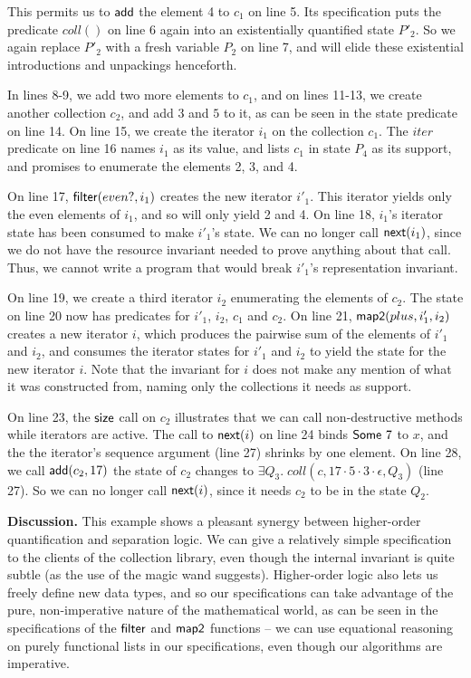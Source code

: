 \documentclass[preprint,natbib]{sigplanconf}
\begin{document}
This permits us to $\mbox{\textsf{{add}}}$ the element 4 to $c_1$ on line 5. Its
specification puts the predicate $coll()$ on line 6 again into an
existentially quantified state $P'_2$. So we again replace $P'_2$ with
a fresh variable $P_2$ on line 7, and will elide these existential
introductions and unpackings henceforth.

In lines 8-9, we add two more elements to $c_1$, and on lines 11-13,
we create another collection $c_2$, and add $3$ and $5$ to it, as can
be seen in the state predicate on line 14. On line 15, we create the
iterator $i_1$ on the collection $c_1$. The $iter$ predicate on line
16 names $i_1$ as its value, and lists $c_1$ in state $P_4$ as its
support, and promises to enumerate the elements 2, 3, and 4.

On line 17, $\mbox{\textsf{{filter}}}(even?, i_1)$ creates the new iterator
$i'_1$. This iterator yields only the even elements of $i_1$, and so
will only yield 2 and 4. On line 18, $i_1$'s iterator state has been
consumed to make $i'_1$'s state. We can no longer call
$\mbox{\textsf{{next}}}(i_1)$, since we do not have the resource invariant
needed to prove anything about that call. Thus, we cannot write a
program that would break $i'_1$'s representation invariant.

On line 19, we create a third iterator $i_2$ enumerating the elements
of $c_2$. The state on line 20 now has predicates for $i'_1$, $i_2$,
$c_1$ and $c_2$. On line 21, $\mbox{\textsf{{map2}}}(plus, i'_1, i_2)$ creates a
new iterator $i$, which produces the pairwise sum of the elements of
$i'_1$ and $i_2$, and consumes the iterator states for $i'_1$ and
$i_2$ to yield the state for the new iterator $i$. Note that the 
invariant for $i$ does not make any mention of what it was constructed
from, naming only the collections it needs as support. 

On line 23, the $\mbox{\textsf{{size}}}$ call on $c_2$ illustrates that we can
call non-destructive methods while iterators are active. The call to
$\mbox{\textsf{{next}}}(i)$ on line 24 binds $\mbox{\textsf{{Some }}}7$ to $x$, and the
the iterator's sequence argument (line 27) shrinks by one element. On
line 28, we call $\mbox{\textsf{{add}}}(c_2, 17)$ the state of $c_2$ changes to
$\exists Q_3.\; coll(c, 17\cdot 5 \cdot 3\cdot\epsilon, Q_3)$ (line
27). So we can no longer call $\mbox{\textsf{{next}}}(i)$, since it needs $c_2$
to be in the state $Q_2$.

\textbf{Discussion.} This example shows a pleasant synergy between
higher-order quantification and separation logic. We can give a
relatively simple specification to the clients of the collection
library, even though the internal invariant is quite subtle (as the
use of the magic wand suggests). Higher-order logic also lets us
freely define new data types, and so our specifications can take
advantage of the pure, non-imperative nature of the mathematical
world, as can be seen in the specifications of the $\mbox{\textsf{{filter}}}$
and $\mbox{\textsf{{map2}}}$ functions -- we can use equational reasoning on
purely functional lists in our specifications, even though our
algorithms are imperative.
\end{document}
